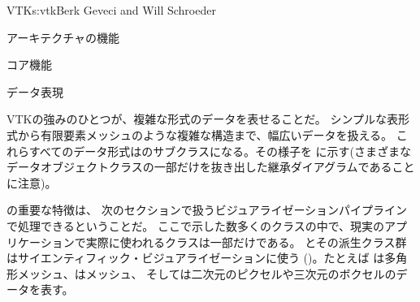 \begin{aosachapter}{VTK}{s:vtk}{Berk Geveci and Will Schroeder}
\begin{aosasect1}{アーキテクチャの機能}
\begin{aosasect2}{コア機能}
\end{aosasect2}

\begin{aosasect2}{データ表現}

VTKの強みのひとつが、複雑な形式のデータを表せることだ。
シンプルな表形式から有限要素メッシュのような複雑な構造まで、幅広いデータを扱える。
これらすべてのデータ形式はのサブクラスになる。その様子を
に示す(さまざまなデータオブジェクトクラスの一部だけを抜き出した継承ダイアグラムであることに注意)。


の重要な特徴は、
次のセクションで扱うビジュアライゼーションパイプラインで処理できるということだ。
ここで示した数多くのクラスの中で、現実のアプリケーションで実際に使われるクラスは一部だけである。
とその派生クラス群はサイエンティフィック・ビジュアライゼーションに使う
()。たとえば
は多角形メッシュ、はメッシュ、
そしては二次元のピクセルや三次元のボクセルのデータを表す。


\end{aosasect2}


\end{aosasect1}
\end{aosachapter}
